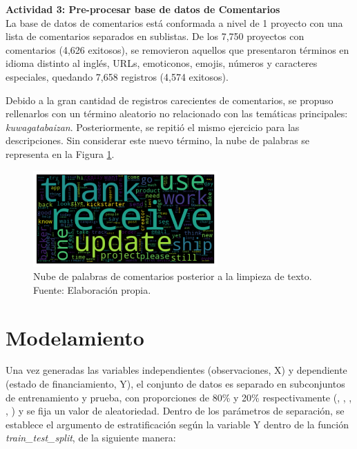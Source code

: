 \textbf{Actividad 3: Pre-procesar base de datos de Comentarios}
\\
La base de datos de comentarios está conformada a nivel de 1 proyecto con una lista de comentarios separados en sublistas. De los 7,750 proyectos con comentarios (4,626 exitosos), se removieron aquellos que presentaron términos en idioma distinto al inglés, URLs, emoticonos, emojis, números y caracteres especiales, quedando 7,658 registros (4,574 exitosos).

Debido a la gran cantidad de registros carecientes de comentarios, se propuso rellenarlos con un término aleatorio no relacionado con las temáticas principales: \textit{kuwagatabaizan}. Posteriormente, se repitió el mismo ejercicio para las descripciones. Sin considerar este nuevo término, la nube de palabras se representa en la Figura \ref{4:fig25}.

\begin{figure}[!ht]
	\begin{center}
		\includegraphics[width=0.63\textwidth]{4/figures/comments_wordcloud_processed.png}
		\caption[Nube de palabras de comentarios posterior a la limpieza de texto]{Nube de palabras de comentarios posterior a la limpieza de texto.\\
			Fuente: Elaboración propia.}
		\label{4:fig25}
	\end{center}
\end{figure}

\section{Modelamiento}
Una vez generadas las variables independientes (observaciones, X) y dependiente (estado de financiamiento, Y), el conjunto de datos es separado en subconjuntos de entrenamiento y prueba, con proporciones de 80\% y 20\% respectivamente (\citeauthor{pr_yuan2016textanalytics}, \citeauthor{pr_yu2018deeplearning}, \citeauthor{pr_chen2019keywords_crowdfunding}, \citeauthor{pr_mitra2014phrases}, \citeauthor{pr_sawhney2016usingLT}) y se fija un valor de aleatoriedad. Dentro de los parámetros de separación, se establece el argumento de estratificación según la variable Y dentro de la función \textit{train\_test\_split}, de la siguiente manera:

